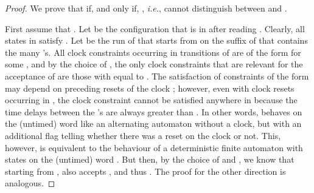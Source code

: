 \documentclass{CSML}
\theoremstyle{plain}\newtheorem{theorem}[thm]{Theorem}
\theoremstyle{plain}\newtheorem{corollary}[thm]{Corollary}
\theoremstyle{plain}\newtheorem{example}[thm]{Example}
\theoremstyle{plain}\newtheorem{lemma}[thm]{Lemma}
\theoremstyle{plain}\newtheorem{remark}[thm]{Remark}
\newcommand*\ie{\textit{i.e.}}
\begin{document}
\begin{proof}
	We prove that  if, and only if, , \ie,  cannot distinguish between  and .
	
	First assume that .	
	Let  be the configuration that  is in after reading . 
	Clearly, all states  in  satisfy . 
	Let  be the run of   that starts from  on the suffix of  that contains the  many 's. 
	All clock constraints occurring in transitions of  are of the form  for some , and by the choice of , 
the only  clock constraints that are relevant for the acceptance of  are those with  equal to . The satisfaction of constraints of the form  may depend on preceding resets of the clock ; however, even with clock resets occurring in , the clock constraint  cannot be satisfied anywhere in  because the time delays between the 's are always greater than .
	In other words,  behaves on the (untimed) word  like an alternating automaton without a clock, but with an additional flag telling whether there was a reset on the clock or not. This, however, is equivalent to the behaviour of a  deterministic finite automaton with  states on the (untimed) word . 
	But then, by the choice of  and , 
	we know that starting from ,  also accepts , and thus . 	
	The proof for the other direction is analogous. 
\end{proof}
	
	
	
	
	
	
	
	
			
		
		
\end{document}
